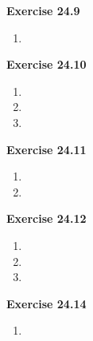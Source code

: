 \textbf{Exercise 24.9}
\begin{enumerate}
    \item 
\end{enumerate}

\textbf{Exercise 24.10}
\begin{enumerate}
    \item 
    \item 
    \item 
\end{enumerate}

\textbf{Exercise 24.11}
\begin{enumerate}
    \item 
    \item 
\end{enumerate}

\textbf{Exercise 24.12}
\begin{enumerate}
    \item 
    \item 
    \item 
\end{enumerate}

\textbf{Exercise 24.14}
\begin{enumerate}
    \item 
\end{enumerate}

